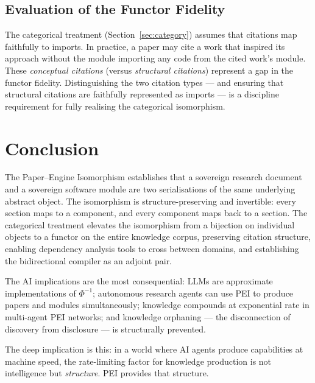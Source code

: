 \documentclass[12pt]{article}
\begin{document}
\subsection{Evaluation of the Functor Fidelity}

The categorical treatment (Section~\ref{sec:category}) assumes that citations
map faithfully to imports.  In practice, a paper may cite a work that inspired
its approach without the module importing any code from the cited work's module.
These \emph{conceptual citations} (versus \emph{structural citations}) represent
a gap in the functor fidelity.  Distinguishing the two citation types — and
ensuring that structural citations are faithfully represented as imports — is a
discipline requirement for fully realising the categorical isomorphism.

\section{Conclusion}
\label{sec:conclusion}

The Paper--Engine Isomorphism establishes that a sovereign research document
and a sovereign software module are two serialisations of the same underlying
abstract object.  The isomorphism is structure-preserving and invertible: every
section maps to a component, and every component maps back to a section.  The
categorical treatment elevates the isomorphism from a bijection on individual
objects to a functor on the entire knowledge corpus, preserving citation
structure, enabling dependency analysis tools to cross between domains, and
establishing the bidirectional compiler as an adjoint pair.

The AI implications are the most consequential: LLMs are approximate
implementations of $\Phi^{-1}$; autonomous research agents can use PEI to
produce papers and modules simultaneously; knowledge compounds at exponential
rate in multi-agent PEI networks; and knowledge orphaning — the disconnection
of discovery from disclosure — is structurally prevented.

The deep implication is this: in a world where AI agents produce capabilities
at machine speed, the rate-limiting factor for knowledge production is not
intelligence but \emph{structure}.  PEI provides that structure.
\end{document}
